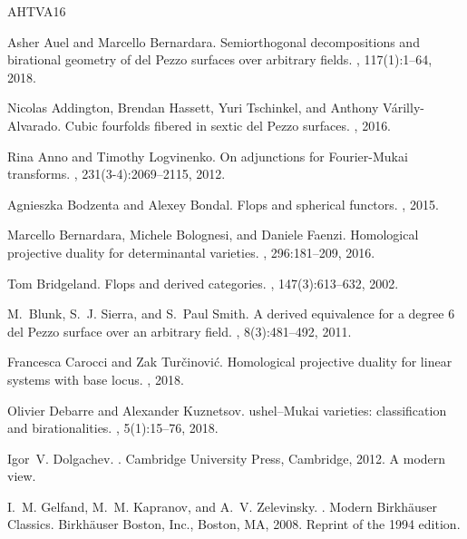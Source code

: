 \documentclass[11pt]{amsart}
\theoremstyle{plain}
\theoremstyle{definition}
\theoremstyle{remark}
\begin{document}
\begin{thebibliography}{AHTVA16}

Asher Auel and Marcello Bernardara.
\newblock Semiorthogonal decompositions and birational geometry of del {P}ezzo
  surfaces over arbitrary fields.
, 117(1):1--64, 2018.

Nicolas Addington, Brendan Hassett, Yuri Tschinkel, and Anthony
  V{\'a}rilly-Alvarado.
\newblock Cubic fourfolds fibered in sextic del {P}ezzo surfaces.
, 2016.

Rina Anno and Timothy Logvinenko.
\newblock On adjunctions for {F}ourier-{M}ukai transforms.
, 231(3-4):2069--2115, 2012.

Agnieszka Bodzenta and Alexey Bondal.
\newblock Flops and spherical functors.
, 2015.

Marcello Bernardara, Michele Bolognesi, and Daniele Faenzi.
\newblock Homological projective duality for determinantal varieties.
, 296:181--209, 2016.

Tom Bridgeland.
\newblock Flops and derived categories.
, 147(3):613--632, 2002.

M.~Blunk, S.~J. Sierra, and S.~Paul Smith.
\newblock A derived equivalence for a degree 6 del {P}ezzo surface over an
  arbitrary field.
, 8(3):481--492, 2011.

Francesca Carocci and Zak Tur\v{c}inovi\'{c}.
\newblock Homological projective duality for linear systems with base locus.
, 2018.

Olivier Debarre and Alexander Kuznetsov.
ushel--{M}ukai varieties: classification and birationalities.
, 5(1):15--76, 2018.

Igor~V. Dolgachev.
.
\newblock Cambridge University Press, Cambridge, 2012.
\newblock A modern view.

I.~M. Gelfand, M.~M. Kapranov, and A.~V. Zelevinsky.
.
\newblock Modern Birkh\"auser Classics. Birkh\"auser Boston, Inc., Boston, MA,
  2008.
\newblock Reprint of the 1994 edition.


\end{thebibliography}
\end{document}
